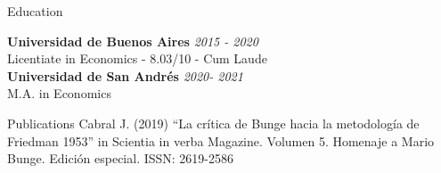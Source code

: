 \documentclass{resume} %
\begin{document}

\begin{rSection}{Education}

{\bf Universidad de Buenos Aires} \hfill {\em 2015 - 2020} 
\\ Licentiate in Economics - 8.03/10 - Cum Laude
\\
{\bf Universidad de San Andrés} \hfill {\em 2020- 2021} 
\\ M.A. in Economics 




\end{rSection}
\begin{rSection}{Publications}
Cabral J. (2019) “La crítica de Bunge hacia la metodología de Friedman 1953” in Scientia in verba Magazine. Volumen 5. Homenaje a Mario Bunge. Edición especial. ISSN: 2619-2586
\end{rSection}
\end{document}
